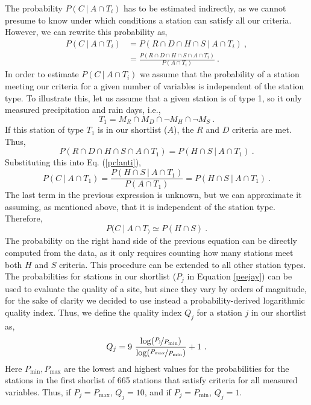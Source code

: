 \documentclass[12pt]{iopart}
\begin{document}
 The probability $P(C\ |\ A\cap T_i)$ has to be estimated indirectly, as we cannot presume to know under which conditions a station can satisfy all our criteria. However, we can rewrite this probability as,
\begin{eqnarray}
P(C\ |\ A\cap T_i)&=P(R\cap D\cap H\cap S\ |\ A\cap T_i)\ , \\
\label{pclanti}
&=\frac{P(R\cap D\cap H\cap S\cap A\cap T_i)}{P(A\cap T_i)}\ . 
\end{eqnarray}
In order to estimate $P(C\ |\ A\cap T_i)$ we assume that the probability of a station meeting our criteria for a given number of variables is independent of the station type. To illustrate this, let us assume that a given station is of type 1, so it only measured precipitation and rain days, i.e.,
\begin{equation}
T_1=M_R\cap M_D\cap\neg M_H\cap\neg M_S\ .
\end{equation}
If this station of type $T_1$ is in our shortlist ($A$), the $R$ and $D$ criteria are met. Thus,
\begin{equation}
P(R\cap D\cap H\cap S\cap A\cap T_1)=P( H\cap S\ |\ A\cap T_1)\ .
\end{equation}
Substituting this into Eq. (\ref{pclanti}),
\begin{equation}
P(C\ |\ A\cap T_1)=\frac{P( H\cap S\ |\ A\cap T_1)}{P(A\cap T_1)}=P(H\cap S\ |\ A\cap T_1) \ .
\end{equation}
The last term in the previous expression is unknown, but we can approximate it assuming, as mentioned above, that it is independent of the station type. Therefore, 
\begin{equation}
P(C\ |\ A\cap T_)\simeq P(H\cap S)\ .
\end{equation}
The probability on the right hand side of the previous equation can be directly computed from the data, as it only requires counting how many stations meet both $H$ and $S$ criteria. This procedure can be extended to all other station types.\\

The probabilities for stations in our shortlist ($P_j$ in Equation \ref{peejay}) can be used to evaluate the quality of a site, but since they vary by orders of magnitude, for the sake of clarity we decided to use instead a probability-derived logarithmic quality index. Thus, we define the quality index $Q_j$ for a station $j$ in our shortlist as,
\begin{equation}
Q_j=9\ \frac{\log (\nicefrac{P_\mathrm{j}}{P_\mathrm{min}})}{\log (\nicefrac{P_\mathrm{max}}{P_\mathrm{min}})}+1\ .
\end{equation}
Here $P_\mathrm{min},P_\mathrm{max}$ are the lowest and highest values for the probabilities for the stations in the first shorlist of 665 stations that satisfy criteria for all measured variables. Thus, if $P_j=P_\mathrm{max}$, $Q_j=10$, and if $P_j=P_\mathrm{min}$, $Q_j=1$.
\end{document}
